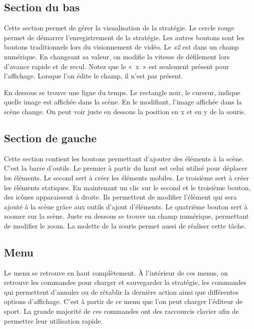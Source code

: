 \subsection{Section du bas}

Cette section permet de gérer la visualisation de la stratégie. Le cercle rouge permet de démarrer l'enregistrement de la stratégie. Les autres boutons sont les boutons traditionnels lors du visionnement de vidéo. Le \textit{x2} est dans un champ numérique. En changeant sa valeur, on modifie la vitesse de défilement lors d'avance rapide et de recul. Notez que le «~x~» est seulement présent pour l'affichage. Lorsque l'on édite le champ, il n'est pas présent.

En dessous se trouve une ligne du temps. Le rectangle noir, le curseur, indique quelle image est affichée dans la scène. En le modifiant, l'image affichée dans la scène change. On peut voir juste en dessous la position en x et en y de la souris.

\subsection{Section de gauche}

Cette section contient les boutons permettant d'ajouter des éléments à la scène. C'est la barre d'outils. Le premier à partir du haut est celui utilisé pour déplacer les éléments. Le second sert à créer les éléments mobiles. Le troisième sert à créer les éléments statiques. En maintenant un clic sur le second et le troisième bouton, des icônes apparaissent à droite. Ils permettent de modifier l'élément qui sera ajouté à la scène grâce aux outils d'ajout d'éléments. Le quatrième bouton sert à zoomer sur la scène. Juste en dessous se trouve un champ numérique, permettant de modifier le zoom. La molette de la souris permet aussi de réaliser cette tâche.

\subsection{Menu}

Le menu se retrouve en haut complètement. À l'intérieur de ces menus, on retrouve les commandes pour charger et sauvegarder la stratégie, les commandes qui permettent d'annuler ou de rétablir la dernière action ainsi que différentes options d'affichage. C'est à partir de ce menu que l'on peut charger l'éditeur de sport. La grande majorité de ces commandes ont des raccourcis clavier afin de permettre leur utilisation rapide.


